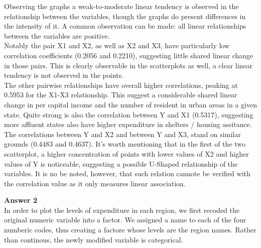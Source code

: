 \documentclass[12pt,letterpaper]{article}
\begin{document}
\vspace{0.5cm}
\noindent Observing the graphs a weak-to-moderate linear tendency is observed in the relationship between the variables, though the graphs do present differences in the intensity of it. A common observation can be made: all linear relationships between the variables are positive. \\
\noindent Notably the pair X1 and X2, as well as X2 and X3, have particularly low correlation coefficients (0.2056 and 0.2210), suggesting little shared linear change in those pairs. This is clearly observable in the scatterplots as well, a clear linear tendency is not observed in the points. \\
\noindent The other pairwise relationships have overall higher correlations, peaking at 0.5953 for the X1-X3 relationship. This suggest a considerable shared linear change in per capital income and the number of resident in urban areas in a given state. Quite strong is also the correlation between Y and X1 (0.5317), suggesting more affluent states also have higher expenditure in shelters / housing assitance. \\
\noindent The correlations between Y and X2 and between Y and X3, stand on similar grounds (0.4483 and 0.4637). It's worth mentioning that in the first of the two scatterplot, a higher concentration of points with lower values of X2 and higher values of Y is noticeable, suggesting a possible U-Shaped relationship of the variables. It is no be noted, however, that such relation cannote be verified with the correlation value as it only measures linear association. \\
\vspace{1cm}

\noindent\textbf{Answer 2} \\

\noindent In order to plot the levels of expenditure in each region, we first recoded the original numeric variable into a factor. We assigned a name to each of the four numberic codes, thus creating a factore whose levels are the region names. Rather than continous, the newly modified variable is categorical. \\
\end{document}
